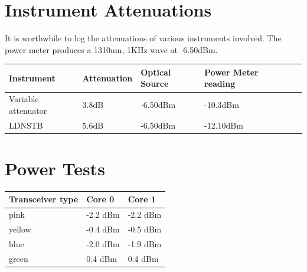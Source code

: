 \documentclass{article}
\begin{document}
\section*{Instrument Attenuations}

It is worthwhile to log the attenuations of various instruments involved. The power meter produces a 1310nm, 1KHz wave at -6.50dBm. 

\begin{center}
\begin{tabular}{|l|l|l|l|l|p{3cm}|}
	\hline
	Instrument & Attenuation & Optical Source & Power Meter reading\\ \hline
	Variable attenuator & 3.8dB & -6.50dBm & -10.3dBm\\ \hline
	LDNSTB & 5.6dB & -6.50dBm & -12.10dBm \\ \hline
\end{tabular}	
\end{center}
 

\section*{Power Tests}
\begin{center}
\begin{tabular}{|l|l|p{3cm}|}
	\hline
	 Transceiver type & Core 0  & Core 1 \\ \hline
	 pink & -2.2 dBm &  -2.2 dBm  \\ \hline
	 yellow & -0.4 dBm &  -0.5 dBm \\ \hline
	 blue & -2.0 dBm & -1.9 dBm\\ \hline
	 green & 0.4 dBm & 0.4 dBm \\ \hline
\end{tabular}
\end{center}
\end{document}
